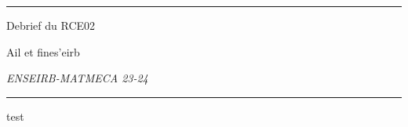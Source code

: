 \documentclass[6pt,a4paper]{article}
\begin{document}
\titlepage
\begin{center}
	\rule{\textwidth}{1pt}

	\vspace{1\baselineskip}

	\Large D\large ebrief du RCE02

	\vspace{1\baselineskip}

	\large Ail et fines'eirb

	\vspace{1\baselineskip}

	\textit{ENSEIRB-MATMECA 23-24}

	\rule{\textwidth}{1pt}
\end{center}


\newpage
\begin{center}
	\tableofcontents
\end{center}


\newpage
test
\end{document}
